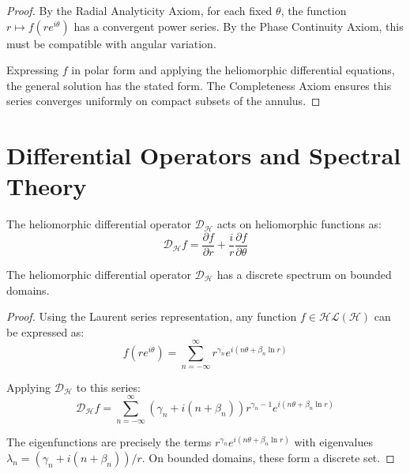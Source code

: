 \begin{proof}
By the Radial Analyticity Axiom, for each fixed $\theta$, the function $r \mapsto f(re^{i\theta})$ has a convergent power series. By the Phase Continuity Axiom, this must be compatible with angular variation.

Expressing $f$ in polar form and applying the heliomorphic differential equations, the general solution has the stated form. The Completeness Axiom ensures this series converges uniformly on compact subsets of the annulus.
\end{proof}

\section{Differential Operators and Spectral Theory}

\begin{definition}
The heliomorphic differential operator $\mathcal{D}_{\mathcal{H}}$ acts on heliomorphic functions as:
\begin{equation}
\mathcal{D}_{\mathcal{H}}f = \frac{\partial f}{\partial r} + \frac{i}{r}\frac{\partial f}{\partial \theta}
\end{equation}
\end{definition}

\begin{theorem}
The heliomorphic differential operator $\mathcal{D}_{\mathcal{H}}$ has a discrete spectrum on bounded domains.
\end{theorem}

\begin{proof}
Using the Laurent series representation, any function $f \in \mathcal{HL}(\mathcal{H})$ can be expressed as:
\begin{equation}
f(re^{i\theta}) = \sum_{n=-\infty}^{\infty} r^{\gamma_n} e^{i(n\theta + \beta_n \ln r)}
\end{equation}

Applying $\mathcal{D}_{\mathcal{H}}$ to this series:
\begin{equation}
\mathcal{D}_{\mathcal{H}}f = \sum_{n=-\infty}^{\infty} (\gamma_n + i(n + \beta_n))r^{\gamma_n-1} e^{i(n\theta + \beta_n \ln r)}
\end{equation}

The eigenfunctions are precisely the terms $r^{\gamma_n} e^{i(n\theta + \beta_n \ln r)}$ with eigenvalues $\lambda_n = (\gamma_n + i(n + \beta_n))/r$. On bounded domains, these form a discrete set.
\end{proof}

